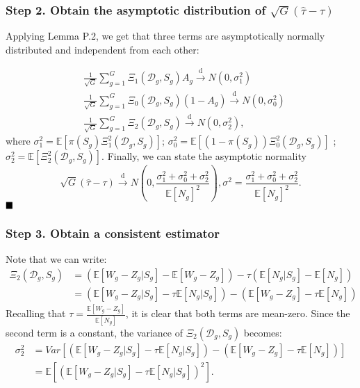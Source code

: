 \documentclass{article}
\renewcommand{\qed}{\hfill\blacksquare}
\begin{document}
\subsubsection*{Step 2. Obtain the asymptotic distribution of $\sqrt{G}(\hat{\tau} - \tau)$}
Applying Lemma P.2, we get that three terms are asymptotically normally distributed and independent from each other:

\begin{align}
	&\frac{1}{\sqrt{G}} \sum_{g=1}^{G} \Xi_1(\mathcal D_g, S_g) A_g \xrightarrow{\text{d}}N(0,\sigma_1^2) \nonumber \\
	&\frac{1}{\sqrt{G}} \sum_{g=1}^{G} \Xi_0(\mathcal D_g, S_g) (1-A_g) \xrightarrow{\text{d}}N(0,\sigma_0^2) \nonumber \\
	&\frac{1}{\sqrt{G}} \sum_{g=1}^{G} \Xi_2(\mathcal D_g, S_g) \xrightarrow{\text{d}}N(0,\sigma_2^2), \nonumber
\end{align}
where $\sigma_1^2 = \mathbb E[\pi(S_g) \Xi_1^2(\mathcal D_g, S_g)]$; $\sigma_0^2 = \mathbb E[(1-\pi(S_g)) \Xi_0^2(\mathcal D_g, S_g)]$ ; $\sigma_2^2 = \mathbb E[\Xi_2^2(\mathcal D_g, S_g)]$. Finally, we can state the asymptotic normality
\[\sqrt{G}(\hat{\tau} - \tau) \xrightarrow{\text{d}}N\left(0,\frac{\sigma^2_1 + \sigma_0^2 + \sigma_2^2}{\mathbb E[N_g]^2}\right), \sigma^2 = \frac{\sigma^2_1 + \sigma_0^2 + \sigma_2^2}{\mathbb E[N_g]^2}.\]
\hfill $\qed$

\subsubsection*{Step 3. Obtain a consistent estimator}

Note that we can write:
\begin{align}
\Xi_2(\mathcal D_g,S_g) &= \left( \mathbb E[W_g - Z_g |S_g] - \mathbb E[W_g - Z_g] \right) - \tau (\mathbb E[N_g|S_g] - \mathbb E[N_g]) \nonumber \\
&=\left( \mathbb E[W_g - Z_g |S_g]- \tau \mathbb E[N_g|S_g]\right) - \left(\mathbb E[W_g - Z_g] - \tau \mathbb E[N_g] \right) \nonumber
\end{align}
Recalling that $ \tau = \frac{\mathbb E [W_g - Z_g]}{\mathbb E[N_g]}$, it is clear that both terms are mean-zero. Since the second term is a constant, the variance of $\Xi_2(\mathcal D_g, S_g)$ becomes:
\begin{align}
\sigma_2^2 &= Var\left[ \left(\mathbb E[W_g - Z_g|S_g] - \tau \mathbb E [N_g|S_g] \right) - \left(\mathbb E[W_g - Z_g] - \tau \mathbb E[N_g] \right) \right]	\nonumber \\
&= \mathbb E [ \left( \mathbb E[W_g - Z_g|S_g] - \tau \mathbb E[N_g|S_g] \right)^2] \nonumber .
\end{align}
\end{document}
